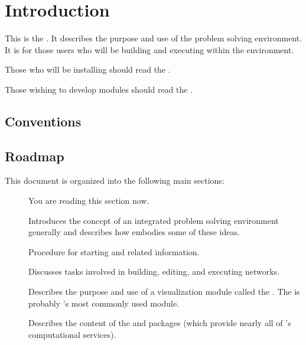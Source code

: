 %

\section{Introduction}
\label{sec:intro}

This is the \etitle{\srug}.  It describes the purpose and use of the \pse{}
problem solving environment.  It is for those users who will be building
and executing  within the \pse{} environment.

Those who will be installing \pse{} should read the \etitle{\srig}.

Those wishing to develop modules should read the \etitle{\srdg}.


\subsection{Conventions}
\label{sec:conventions}


\subsection{Roadmap}
\label{sec:roadmap}

This document is organized into the following main sections:

\begin{description}
\item[] You are reading this section now.
\item[] Introduces the concept of an
  integrated problem solving environment generally and describes how \PSE{}
  embodies some of these ideas.
\item[]  Procedure for starting \pse{}
  and related information.
\item[] Discusses tasks involved in
  building, editing, and executing networks.
\item[] Describes the
  purpose and use of a visualization module called the \viewer{}.  The
  \viewer{} is probably \pse{}'s most commonly used module.
\item[] Describes the content of the \sr{}
  and \pse{} packages (which provide nearly all of \pse{}'s computational
  services). 
\end{description}

